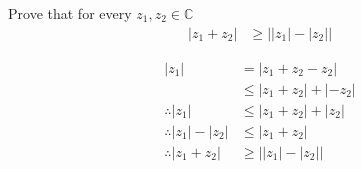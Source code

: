 \documentclass[fleqn, a4paper, 11pt, oneside]{amsart}
\theoremstyle{definition}
\theoremstyle{theorem}
\begin{document}
\setcounter{question}{7}
\begin{question}
	Prove that for every $z_1,z_2 \in \mathbb{C}$
	\begin{align*}
		|z_1 + z_2| &\ge \left| |z_1| - |z_2| \right|
	\end{align*}
\end{question}

\begin{solution}
	\begin{align*}
		|z_1| &= |z_1 + z_2 - z_2|\\
		&\le |z_1 + z_2| + |-z_2|\\
		\therefore |z_1| &\le |z_1 + z_2| + |z_2|\\
		\therefore |z_1| - |z_2| &\le |z_1 + z_2|\\
		\therefore |z_1 + z_2| &\ge \left| |z_1| - |z_2| \right|
	\end{align*}
\end{solution}
\end{document}
